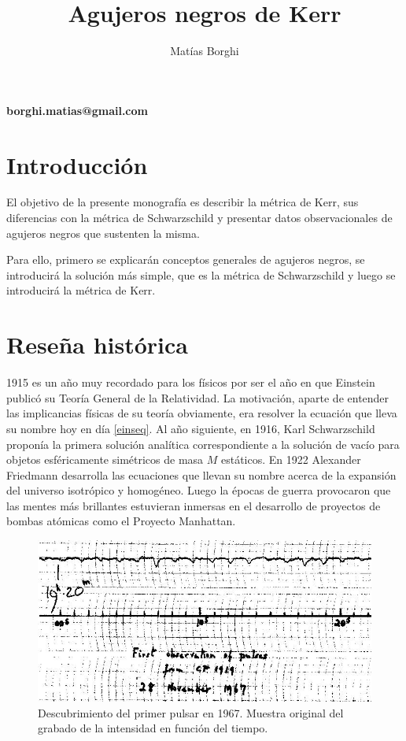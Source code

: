 \documentclass[12pt]{article}
\title{Agujeros negros de Kerr}
\author{Matías Borghi}
\theoremstyle{plain}
\begin{document}
\maketitle

\begin{center}
\textbf{borghi.matias@gmail.com}
\end{center}

\tableofcontents
\section{Introducción}
El objetivo de la presente monografía es describir la métrica de Kerr, sus diferencias con la métrica de Schwarzschild y presentar datos observacionales de agujeros negros que sustenten la misma.

Para ello, primero se explicarán conceptos generales de agujeros negros, se introducirá la solución más simple, que es la métrica de Schwarzschild y luego se introducirá la métrica de Kerr.
\section{Reseña histórica}
1915 es un año muy recordado para los físicos por ser el año en que Einstein publicó su Teoría General de la Relatividad. La motivación, aparte de entender las implicancias físicas de su teoría obviamente, era resolver la ecuación que lleva su nombre hoy en día \ref{einseq}. Al año siguiente, en 1916, Karl Schwarzschild proponía la primera solución analítica correspondiente a la solución de vacío para objetos esféricamente simétricos de masa $M$ estáticos. En 1922 Alexander Friedmann desarrolla las ecuaciones que llevan su nombre acerca de la expansión del universo isotrópico y homogéneo. Luego la épocas de guerra provocaron que las mentes más brillantes estuvieran inmersas en el desarrollo de proyectos de bombas atómicas como el Proyecto Manhattan. 

\begin{figure}[H]
\centering
\includegraphics[width=\textwidth]{pulsar.jpg}
\caption{Descubrimiento del primer pulsar en 1967. Muestra original del grabado de la intensidad en función del tiempo.}
\label{pulsar}
\end{figure}
\end{document}
